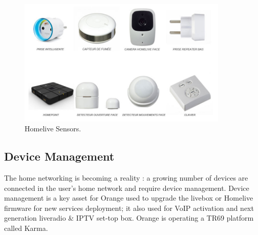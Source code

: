 \begin{figure}[htbp]
	\centering
		\includegraphics[width=10cm]{Figures/home-live_capteurs.jpg}
	\caption[Homelive Sensors]{Homelive Sensors.}%
	\label{fig:2}
\end{figure}
\subsection{Device Management}
The home networking is becoming a reality : a growing number of devices are connected in the user's home network and require device management. Device management is a key asset for Orange used to upgrade the livebox or Homelive firmware for new services deployment; it also used for VoIP activation and next generation liveradio & IPTV set-top box. Orange is operating a TR69 platform called Karma.

